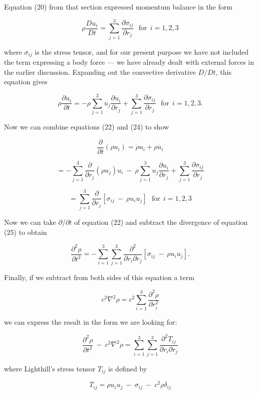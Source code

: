   Equation (20) from that section expressed momentum balance in the form 

  $$\rho \dfrac{Du_i}{Dt}=\sum_{j=1}^3{\dfrac{\partial \sigma_{ij}}{\partial 
  r_j}}\mathrm{~~~for~~}i=1,2,3 \tag{23}$$ 

  where $\sigma_{ij}$ is the stress tensor, and for our present purpose we have 
  not included the term expressing a body force --- we have already dealt with 
  external forces in the earlier discussion. Expanding out the convective 
  derivative $D/Dt$, this equation gives 

  $$\rho \dfrac{\partial u_i}{\partial t}=- \rho \sum_{j=1}^3{u_j 
  \dfrac{\partial u_i}{\partial r_j}} + \sum_{j=1}^3{\dfrac{\partial 
  \sigma_{ij}}{\partial r_j}}\mathrm{~~~for~~}i=1,2,3 . \tag{24}$$ 

  Now we can combine equations (22) and (24) to show 

  $$\dfrac{\partial}{\partial t}(\rho u_i) =\dot{\rho} u_i + \rho \dot{u_i}$$ 

  $$= -\sum_{j=1}^3\dfrac{\partial}{\partial r_j} \left( \rho u_j \right) u_i 
  \mathrm{~}-\mathrm{~} \rho \sum_{j=1}^3{u_j \dfrac{\partial u_i}{\partial 
  r_j}} + \sum_{j=1}^3{\dfrac{\partial \sigma_{ij}}{\partial r_j}}$$ 

  $$= \sum_{j=1}^3 \dfrac{\partial}{\partial r_j} \left[\sigma_{ij} 
  \mathrm{~}-\mathrm{~} \rho u_i u_j \right] \mathrm{~~~for~~}i=1,2,3 
  \tag{25}$$ 

  Now we can take $\partial/\partial t$ of equation (22) and subtract the 
  divergence of equation (25) to obtain 

  $$\dfrac{\partial^2 \rho}{\partial t^2} = -\sum_{i=1}^3 \sum_{j=1}^3 
  \dfrac{\partial^2}{\partial r_i \partial r_j} \left[\sigma_{ij} 
  \mathrm{~}-\mathrm{~} \rho u_i u_j \right] . \tag{26}$$ 

  Finally, if we subtract from both sides of this equation a term 

  $$c^2 \nabla^2 \rho = c^2 \sum_{i=1}^3 \dfrac{\partial^2 \rho}{\partial 
  r_i^2} \tag{27}$$ 

  we can express the result in the form we are looking for: 

  $$\dfrac{\partial^2 \rho}{\partial t^2} \mathrm{~}-\mathrm{~} c^2 \nabla^2 
  \rho = \sum_{i=1}^3 \sum_{j=1}^3 \dfrac{\partial^2 T_{ij}}{\partial r_i 
  \partial r_j} \tag{28}$$ 

  where Lighthill's stress tensor $T_{ij}$ is defined by 

  $$T_{ij} = \rho u_i u_j \mathrm{~}-\mathrm{~} \sigma_{ij} 
  \mathrm{~}-\mathrm{~} c^2 \rho \delta_{ij} \tag{29}$$ 

